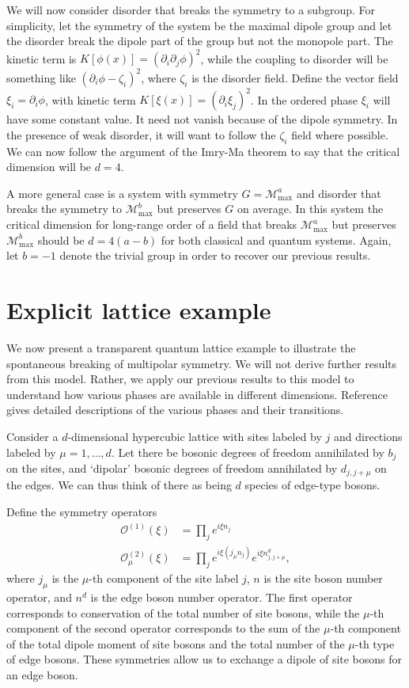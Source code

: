 \documentclass[prb,aps,twocolumn, amsfonts,amsmath,amssymb,nofootinbib,superscriptaddress]{revtex4-2}
\newcommand{\op}[1]{\mathcal{O}^{(#1)}}
\newcommand{\nn}{\nonumber\\}
\renewcommand{\max}{\text{max}}
\newcommand{\mmax}[1]{\mathcal{M}^{#1}_\max}
\begin{document}
We will now consider disorder that breaks the symmetry to a subgroup. For simplicity, let the symmetry of the system be the maximal dipole group and let the disorder break the dipole part of the group but not the monopole part. The kinetic term is $K[\phi(x)]= (\partial_i \partial_j \phi)^2$, while the coupling to disorder will be something like $(\partial_i\phi - \zeta_i)^2$, where $\zeta_i$ is the disorder field. 
Define the vector field $\xi_i = \partial_i\phi$, with kinetic term $K[\xi(x)]= (\partial_i \xi_j)^2$. In the ordered phase $\xi_i$ will have some constant value. It need not vanish because of the dipole symmetry. In the presence of weak disorder, it will want to follow the $\zeta_i$ field where possible. We can now follow the argument of the Imry-Ma theorem to say that the critical dimension will be $d=4$.

A more general case is a system with symmetry $G = \mathcal{M}_\max^a$ and disorder that breaks the symmetry to $\mathcal{M}_\max^b$ but preserves $G$ on average. In this system the critical dimension for long-range order of a field that breaks $\mmax{a}$ but preserves $\mmax{b}$ should be $d=4(a-b)$ for both classical and quantum systems. Again, let $b=-1$ denote the trivial group in order to recover our previous results.

\section{Explicit lattice example} \label{sec:example}

We now present a transparent quantum lattice example to illustrate the spontaneous breaking of multipolar symmetry. We will not derive further results from this model. Rather, we apply our previous results to this model to understand how various phases are available in different dimensions. Reference~\cite{dbhm} gives detailed descriptions of the various phases and their transitions.

Consider a $d$-dimensional hypercubic lattice with sites labeled by $j$ and directions labeled by $\mu = 1,\dots,d$. Let there be bosonic degrees of freedom annihilated by $b_j$ on the sites, and `dipolar' bosonic degrees of freedom annihilated by $d_{j,j+\mu}$ on the edges. We can thus think of there as being $d$ species of edge-type bosons.

Define the symmetry operators
\begin{align}
\op{1}(\xi) &= \prod_je^{i\xi n_j}\nn
\op{2}_\mu(\xi) &= \prod_j e^{i\xi (j_\mu n_j)}e^{i\xi n^d_{j,j+\mu}},
\end{align}
where $j_\mu$ is the $\mu$-th component of the site label $j$, $n$ is the site boson number operator, and $n^d$ is the edge boson number operator.
The first operator corresponds to conservation of the total number of site bosons, while the $\mu$-th component of the second operator corresponds to the sum of the $\mu$-th component of the total dipole moment of site bosons and the total number of the $\mu$-th type of edge bosons. These symmetries allow us to exchange a dipole of site bosons for an edge boson. 
\end{document}
